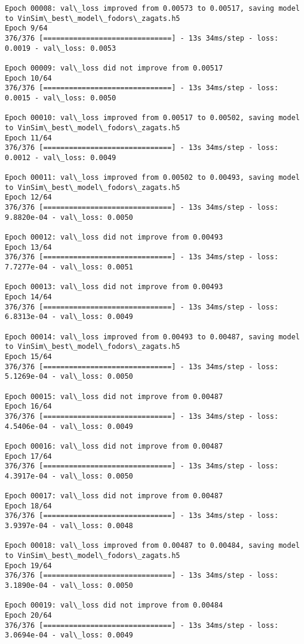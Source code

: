 \documentclass[11pt]{article}
\begin{document}
\begin{Verbatim}[commandchars=\\\{\}]
Epoch 00008: val\_loss improved from 0.00573 to 0.00517, saving model to VinSim\_best\_model\_fodors\_zagats.h5
Epoch 9/64
376/376 [==============================] - 13s 34ms/step - loss: 0.0019 - val\_loss: 0.0053

Epoch 00009: val\_loss did not improve from 0.00517
Epoch 10/64
376/376 [==============================] - 13s 34ms/step - loss: 0.0015 - val\_loss: 0.0050

Epoch 00010: val\_loss improved from 0.00517 to 0.00502, saving model to VinSim\_best\_model\_fodors\_zagats.h5
Epoch 11/64
376/376 [==============================] - 13s 34ms/step - loss: 0.0012 - val\_loss: 0.0049

Epoch 00011: val\_loss improved from 0.00502 to 0.00493, saving model to VinSim\_best\_model\_fodors\_zagats.h5
Epoch 12/64
376/376 [==============================] - 13s 34ms/step - loss: 9.8820e-04 - val\_loss: 0.0050

Epoch 00012: val\_loss did not improve from 0.00493
Epoch 13/64
376/376 [==============================] - 13s 34ms/step - loss: 7.7277e-04 - val\_loss: 0.0051

Epoch 00013: val\_loss did not improve from 0.00493
Epoch 14/64
376/376 [==============================] - 13s 34ms/step - loss: 6.8313e-04 - val\_loss: 0.0049

Epoch 00014: val\_loss improved from 0.00493 to 0.00487, saving model to VinSim\_best\_model\_fodors\_zagats.h5
Epoch 15/64
376/376 [==============================] - 13s 34ms/step - loss: 5.1269e-04 - val\_loss: 0.0050

Epoch 00015: val\_loss did not improve from 0.00487
Epoch 16/64
376/376 [==============================] - 13s 34ms/step - loss: 4.5406e-04 - val\_loss: 0.0049

Epoch 00016: val\_loss did not improve from 0.00487
Epoch 17/64
376/376 [==============================] - 13s 34ms/step - loss: 4.3917e-04 - val\_loss: 0.0050

Epoch 00017: val\_loss did not improve from 0.00487
Epoch 18/64
376/376 [==============================] - 13s 34ms/step - loss: 3.9397e-04 - val\_loss: 0.0048

Epoch 00018: val\_loss improved from 0.00487 to 0.00484, saving model to VinSim\_best\_model\_fodors\_zagats.h5
Epoch 19/64
376/376 [==============================] - 13s 34ms/step - loss: 3.1890e-04 - val\_loss: 0.0050

Epoch 00019: val\_loss did not improve from 0.00484
Epoch 20/64
376/376 [==============================] - 13s 34ms/step - loss: 3.0694e-04 - val\_loss: 0.0049


\end{Verbatim}
\end{document}
